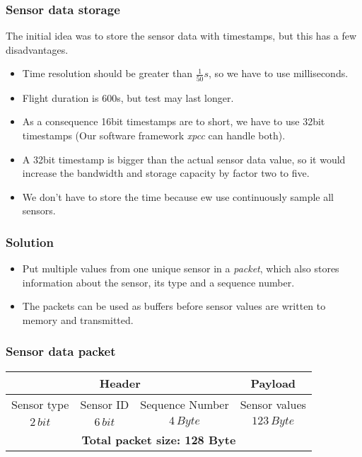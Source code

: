 \documentclass[12pt, a4paper]{scrreprt}
\begin{document}
\subsubsection{Sensor data storage}
The initial idea was to store the sensor data with timestamps, but this has a few disadvantages.
\begin{itemize}
	\item Time resolution should be greater than $\frac{1}{50}s$, so we have to use milliseconds.
	\item Flight duration is 600s, but test may last longer.
	\item As a consequence 16bit timestamps are to short, we have to use 32bit timestamps (Our software framework \textit{xpcc} can handle both).
	\item A 32bit timestamp is bigger than the actual sensor data value, so it would increase the bandwidth and storage capacity by factor two to five.
	\item We don't have to store the time because ew use continuously sample all sensors.
\end{itemize}

\subsubsection{Solution}
\begin{itemize}
	\item Put multiple values from one unique sensor in a \textit{packet}, which also stores information about the sensor, its type and a sequence number.
	\item The packets can be used as buffers before sensor values are written to memory and transmitted.
\end{itemize}

\subsubsection{Sensor data packet}
\begin{tabular}{|c|c|c|c|}
	\hline 
	\multicolumn{3}{|c|}{\textbf{Header}} & \textbf{Payload} \\ 
	\hline 
	Sensor type & Sensor ID & Sequence Number  & Sensor values \\ 
	\hline 
	$2\,bit$ & $6\,bit$ & $4\,Byte$ & $123\,Byte$ \\ 
	\hline 
	\multicolumn{4}{|c|}{\textbf{Total packet size: 128 Byte}} \\ 
	\hline 
\end{tabular} 
\end{document}
